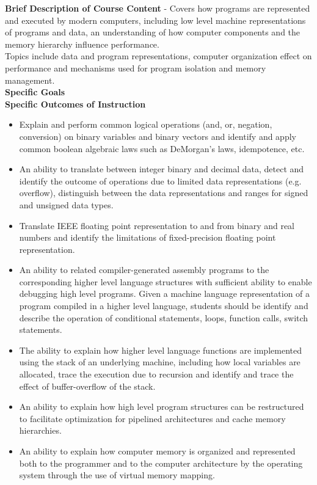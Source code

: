 \documentclass{article}
\begin{document}
\noindent \textbf{Brief Description of Course Content} - Covers how programs are represented and executed by modern computers, including low level machine representations of programs and data, an understanding of how computer components and the memory hierarchy influence performance. \\

\noindent Topics include data and program representations, computer organization effect on performance and mechanisms used for program isolation and memory management. \\

\noindent \textbf{Specific Goals} \\

\noindent \textbf{Specific Outcomes of Instruction}
\begin{itemize}
    \item Explain and perform common logical operations (and, or, negation, conversion) on binary variables and binary vectors and identify and apply common boolean algebraic laws such as DeMorgan’s laws, idempotence, etc.
    \item An ability to translate between integer binary and decimal data, detect and identify the outcome of operations due to limited data representations (e.g. overflow), distinguish between the data representations and ranges for signed and unsigned data types.
    \item Translate IEEE floating point representation to and from binary and real numbers and identify the limitations of fixed-precision floating point representation.
    \item An ability to related compiler-generated assembly programs to the corresponding higher level language structures with sufficient ability to enable debugging high level programs. Given a machine language representation of a program compiled in a higher level language, students should be identify and describe the operation of conditional statements, loops, function calls, switch statements.
    \item The ability to explain how higher level language functions are implemented using the stack of an underlying machine, including how local variables are allocated, trace the execution due to recursion and identify and trace the effect of buffer-overflow of the stack.
    \item An ability to explain how high level program structures can be restructured to facilitate optimization for pipelined architectures and cache memory hierarchies.
    \item An ability to explain how computer memory is organized and represented both to the programmer and to the computer architecture by the operating system through the use of virtual memory mapping.

\end{itemize}
\end{document}
